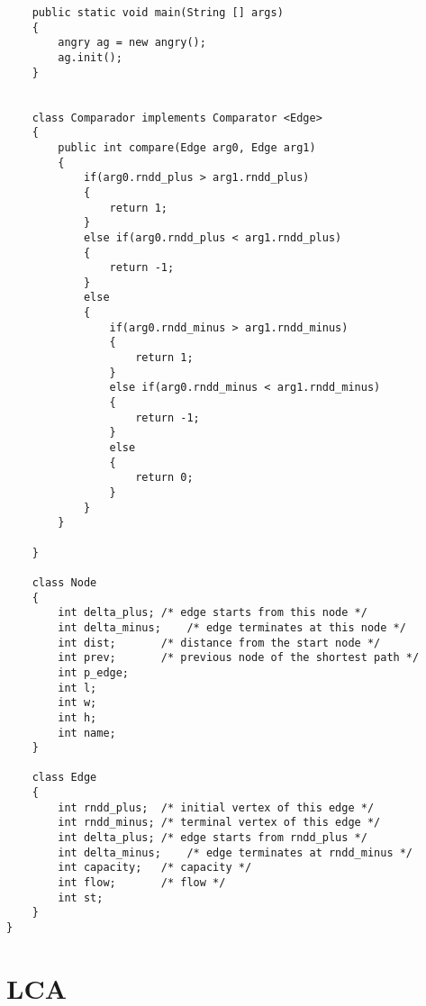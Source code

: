 \documentclass[a4paper, 11pt, oneside]{report}
\begin{document}
\begin{verbatim}
	public static void main(String [] args)
	{
		angry ag = new angry();
		ag.init();
	}
	

	class Comparador implements Comparator <Edge> 
	{
		public int compare(Edge arg0, Edge arg1) 
		{
			if(arg0.rndd_plus > arg1.rndd_plus)
			{
				return 1;
			}
			else if(arg0.rndd_plus < arg1.rndd_plus)
			{
				return -1;
			}
			else
			{
				if(arg0.rndd_minus > arg1.rndd_minus)
				{
					return 1;
				}
				else if(arg0.rndd_minus < arg1.rndd_minus)
				{
					return -1;
				}
				else
				{
					return 0;
				}
			}
		}

	}

	class Node 
	{
		int	delta_plus;	/* edge starts from this node */
		int	delta_minus;	/* edge terminates at this node */
		int	dist;		/* distance from the start node */
		int	prev;		/* previous node of the shortest path */
		int	p_edge;
		int	l;
		int	w;
		int	h;
		int	name;
	}

	class Edge 
	{
		int	rndd_plus;	/* initial vertex of this edge */
		int	rndd_minus;	/* terminal vertex of this edge */
		int	delta_plus;	/* edge starts from rndd_plus */
		int	delta_minus;	/* edge terminates at rndd_minus */
		int	capacity;	/* capacity */
		int	flow;		/* flow */
		int	st;
	}
}

\end{verbatim}

\section{LCA}
\end{document}
